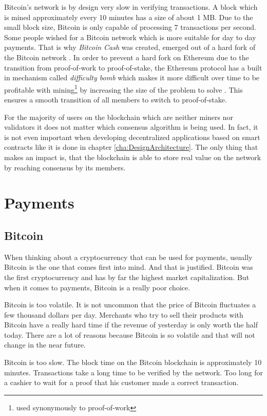 Bitcoin's network is by design very slow in verifying transactions. A block which is mined approximately every 10 minutes has a size of about 1 MB. Due to the small block size, Bitcoin is only capable of processing 7 transactions per second. Some people wished for a Bitcoin network which is more suitable for day to day payments. That is why \textit{Bitcoin Cash} was created, emerged out of a hard fork of the Bitcoin network \cite{BitcoinCash2020} \cite{HillChopraValencourt2018}. In order to prevent a hard fork on Ethereum due to the transition from proof-of-work to proof-of-stake, the Ethereum protocol has a built in mechanism called \textit{difficulty bomb} which makes it more difficult over time to be profitable with mining\footnote{used synonymously to proof-of-work} by increasing the size of the problem to solve \cite{Wood2020}. This ensures a smooth transition of all members to switch to proof-of-stake.

For the majority of users on the blockchain which are neither miners nor validators it does not matter which consensus algorithm is being used. In fact, it is not even important when developing decentralized applications based on smart contracts like it is done in chapter \ref{cha:DesignArchitecture}. The only thing that makes an impact is, that the blockchain is able to store real value on the network by reaching consensus by its members.

\section{Payments}
\subsection{Bitcoin}
When thinking about a cryptocurrency that can be used for payments, usually Bitcoin is the one that comes first into mind. And that is justified. Bitcoin was the first cryptocurrency and has by far the highest market capitalization. But when it comes to payments, Bitcoin is a really poor choice.

Bitcoin is too volatile. It is not uncommon that the price of Bitcoin fluctuates a few thousand dollars per day. Merchants who try to sell their products with Bitcoin have a really hard time if the revenue of yesterday is only worth the half today. There are a lot of reasons because Bitcoin is so volatile and that will not change in the near future. 

Bitcoin is too slow. The block time on the Bitcoin blockchain is approximately 10 minutes. Transactions take a long time to be verified by the network. Too long for a cashier to wait for a proof that his customer made a correct transaction.

